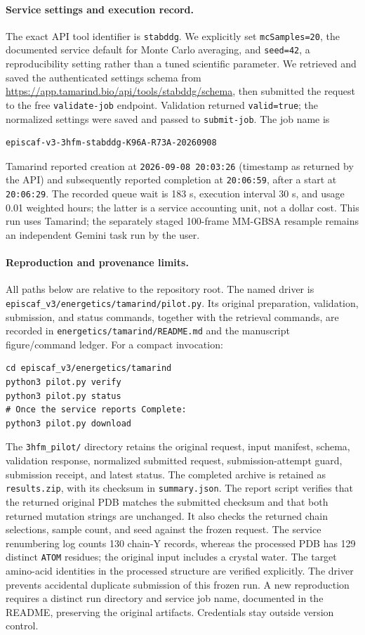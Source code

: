 \paragraph{Service settings and execution record.}
The exact API tool identifier is \texttt{stabddg}. We explicitly set
\texttt{mcSamples=20}, the documented service default for Monte Carlo averaging, and
\texttt{seed=42}, a reproducibility setting rather than a tuned scientific parameter.
We retrieved and saved the authenticated settings schema from
\url{https://app.tamarind.bio/api/tools/stabddg/schema}, then submitted the request to the free
\texttt{validate-job} endpoint. Validation returned \texttt{valid=true}; the normalized settings
were saved and passed to \texttt{submit-job}. The job name is
\begin{verbatim}
episcaf-v3-3hfm-stabddg-K96A-R73A-20260908
\end{verbatim}
Tamarind reported creation at \texttt{2026-09-08 20:03:26} (timestamp as returned by the API)
and subsequently reported completion at \texttt{20:06:59}, after a start at
\texttt{20:06:29}. The recorded queue wait is 183 s, execution interval 30 s, and usage
0.01 weighted hours; the latter is a service accounting unit, not a dollar cost. This run uses Tamarind; the separately staged
100-frame MM-GBSA resample remains an independent Gemini task run by the user.

\paragraph{Reproduction and provenance limits.}
All paths below are relative to the repository root. The named driver is
\texttt{episcaf\_v3/energetics/tamarind/pilot.py}. Its original preparation, validation,
submission, and status commands, together with the retrieval commands, are recorded in
\texttt{energetics/tamarind/README.md} and the manuscript figure/command ledger.
For a compact invocation:
\begin{verbatim}
cd episcaf_v3/energetics/tamarind
python3 pilot.py verify
python3 pilot.py status
# Once the service reports Complete:
python3 pilot.py download
\end{verbatim}
The \texttt{3hfm\_pilot/} directory retains the original request, input manifest, schema,
validation response, normalized submitted request, submission-attempt guard, submission receipt,
and latest status. The completed archive is retained as \texttt{results.zip}, with its checksum in
\texttt{summary.json}. The report script verifies that the returned original PDB matches
the submitted checksum and that both returned mutation strings are unchanged. It also checks
the returned chain selections, sample count, and seed against the frozen request. The service
renumbering log counts 130 chain-Y records, whereas the processed PDB has 129 distinct
\texttt{ATOM} residues; the original input includes a crystal water. The target amino-acid
identities in the processed structure are verified explicitly. The driver prevents accidental duplicate submission of this frozen run.
A new reproduction requires a distinct run directory and service job name, documented in the
README, preserving the original artifacts. Credentials stay outside version control.

